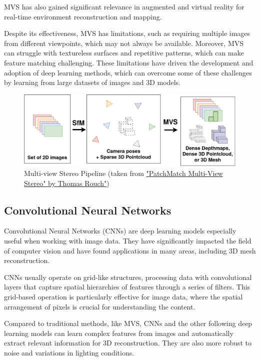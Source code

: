 MVS has also gained significant relevance in augmented and virtual reality for real-time environment reconstruction and mapping.

Despite its effectiveness, MVS has limitations, such as requiring multiple images from different viewpoints, which may not always be available.
Moreover, MVS can struggle with textureless surfaces and repetitive patterns, which can make feature matching challenging.
These limitations have driven the development and adoption of deep learning methods, which can overcome some of these challenges by learning from large datasets of images and 3D models.

\begin{figure}
    \centering
    \includegraphics[width=1\linewidth]{images/multi_view_stereo.png}
    \caption{Multi-view Stereo Pipeline (taken from \href{https://betterprogramming.pub/patchmatch-multi-view-stereo-1-2-fc46e5dfe912}{"PatchMatch Multi-View Stereo" by Thomas Rouch"})}
    \label{fig:multi_view_stereo}
\end{figure}

\subsection{Convolutional Neural Networks} \label{section:cnns}
Convolutional Neural Networks (CNNs) are deep learning models especially useful when working with image data. They have significantly impacted the field of computer vision and have found applications in many areas, including 3D mesh reconstruction.

CNNs usually operate on grid-like structures, processing data with convolutional layers that capture spatial hierarchies of features through a series of filters. This grid-based operation is particularly effective for image data, where the spatial arrangement of pixels is crucial for understanding the content.

Compared to traditional methods, like MVS, CNNs and the other following deep learning models can learn complex features from images and automatically extract relevant information for 3D reconstruction. They are also more robust to noise and variations in lighting conditions.

